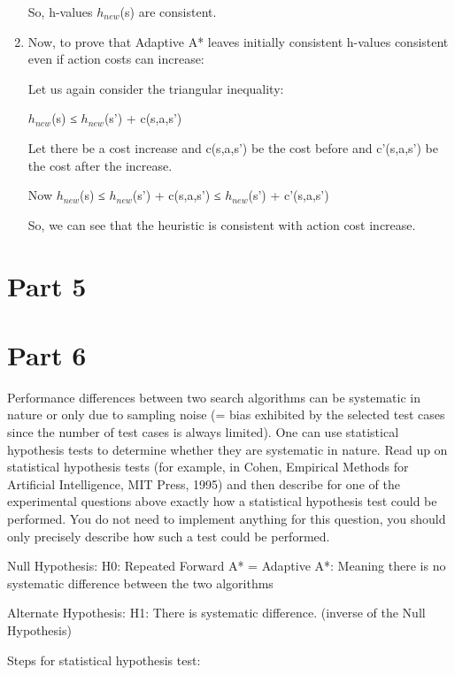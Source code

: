 \documentclass[12pt]{article}
\begin{document}
\begin{enumerate}[label=\alph*]
\begin{flushleft}
So, h-values $h_{new}$(s) are consistent.

\end{flushleft}

\item
\begin{flushleft}


\begin{itshape}
Now, to prove that Adaptive A* leaves initially consistent h-values consistent even if action costs can increase:
\end{itshape}

Let us again consider the triangular inequality:

$h_{new}$(s) ≤ $h_{new}$(s') + c(s,a,s’)

Let there be a cost increase and c(s,a,s’)  be the cost before and c’(s,a,s’) be the cost
after the increase.

Now $h_{new}$(s) ≤  $h_{new}$(s') + c(s,a,s’)  ≤  $h_{new}$(s') + c’(s,a,s’)  

So, we can see that the heuristic is consistent with action cost increase.
        
    \end{flushleft}
   \end{enumerate}
\section*{Part 5}

\section*{Part 6}
\begin{itshape}
Performance differences between two search algorithms can be systematic in nature or only due to sampling noise (= bias exhibited by the selected test cases since the number of test cases is always limited). One can use statistical hypothesis tests to determine whether they are systematic in nature. Read up on statistical hypothesis tests (for example, in Cohen, Empirical Methods for Artificial Intelligence, MIT Press, 1995) and then describe for one of the experimental questions above exactly how a statistical hypothesis test could be performed. You do not need
to implement anything for this question, you should only precisely describe how such a test could be performed.
\end{itshape}

\vskip 0.5cm
\begin {flushleft}
Null Hypothesis: H0: Repeated Forward A* = Adaptive A*: Meaning there is no systematic difference between the two algorithms

Alternate Hypothesis: H1: There is systematic difference. (inverse of the Null Hypothesis)

Steps for statistical hypothesis test:
\end{flushleft}
\end{document}
